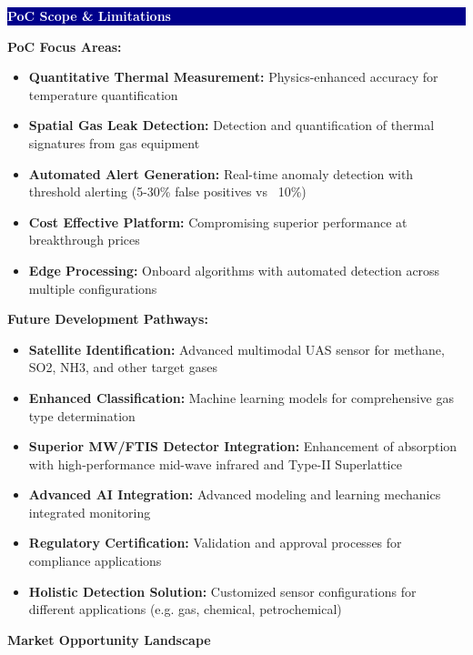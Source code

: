 \documentclass[11pt,a4paper]{article}
\begin{document}
\begin{minipage}{0.48\textwidth}
\colorbox{darkblue}{\parbox{\linewidth}{\centering\textcolor{white}{\textbf{PoC Scope \& Limitations}}}}

\textbf{PoC Focus Areas:}
\begin{itemize}[leftmargin=*,itemsep=0pt]
\item \textbf{Quantitative Thermal Measurement:} Physics-enhanced accuracy for temperature quantification
\item \textbf{Spatial Gas Leak Detection:} Detection and quantification of thermal signatures from gas equipment
\item \textbf{Automated Alert Generation:} Real-time anomaly detection with threshold alerting (5-30\% false positives vs ~10\%)
\item \textbf{Cost Effective Platform:} Compromising superior performance at breakthrough prices
\item \textbf{Edge Processing:} Onboard algorithms with automated detection across multiple configurations
\end{itemize}

\textbf{Future Development Pathways:}
\begin{itemize}[leftmargin=*,itemsep=0pt]
\item \textbf{Satellite Identification:} Advanced multimodal UAS sensor for methane, SO2, NH3, and other target gases
\item \textbf{Enhanced Classification:} Machine learning models for comprehensive gas type determination
\item \textbf{Superior MW/FTIS Detector Integration:} Enhancement of absorption with high-performance mid-wave infrared and Type-II Superlattice
\item \textbf{Advanced AI Integration:} Advanced modeling and learning mechanics integrated monitoring
\item \textbf{Regulatory Certification:} Validation and approval processes for compliance applications
\item \textbf{Holistic Detection Solution:} Customized sensor configurations for different applications (e.g. gas, chemical, petrochemical)
\end{itemize}

\vspace{0.3cm}

\textbf{Market Opportunity Landscape}


\end{minipage}
\end{document}
